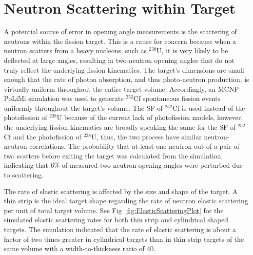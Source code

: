\section{Neutron Scattering within Target}
\label{subsection:Elastic_scattering}
A potential source of error in opening angle measurements is the scattering of neutrons within the fission target.
This is a cause for concern because when a neutron scatters from a heavy nucleons, such as $^{238}$U, it is very likely to be deflected at large angles, resulting in two-neutron opening angles that do not truly reflect the underlying fission kinematics.
The target's dimensions are small enough that the rate of photon absorption, and thus photo-neutron production, is virtually uniform throughout the entire target volume.
Accordingly, an MCNP-PoLiMi simulation was used to generate $^{252}$Cf spontaneous fission events uniformly throughout the target's volume.
The SF of $^{252}$Cf is used instead of the photofission of $^{238}$U because of the current lack of photofission models, however, the underlying fission kinematics are broadly speaking the same for the SF of $^{252}$Cf and the photofission of $^{238}$U, thus, the two process have similar neutron-neutron correlations.
The probability that at least one neutron out of a pair of two scatters before exiting the target was calculated from the simulation, indicating that 6\% of measured two-neutron opening angles were perturbed due to scattering.

The rate of elastic scattering is affected by the size and shape of the target.
A thin strip is the ideal target shape regarding the rate of neutron elastic scattering per unit of total target volume.
See Fig~\ref{fig:ElasticScatteringPlot} for the simulated elastic scattering rates for both thin strip and cylindrical shaped targets.
The simulation indicated that the rate of elastic scattering is about a factor of two times greater in cylindrical targets than in thin strip targets of the same volume with a width-to-thickness ratio of 40.

